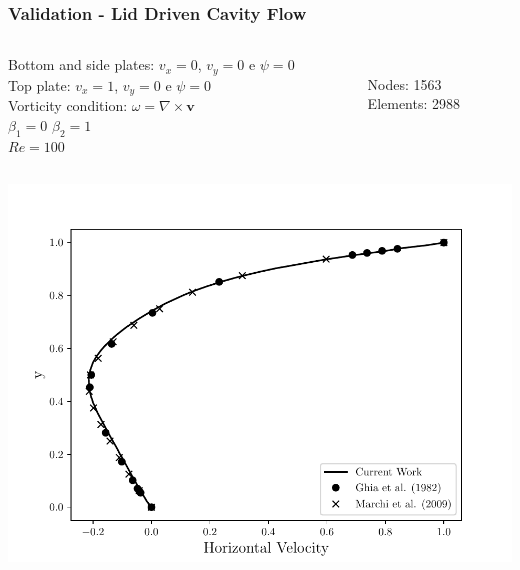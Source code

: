 \begin{frame}
 \frametitle{\LARGE Validation - Lid Driven Cavity Flow}
\vspace{-1.0cm}
\begin{center}
\begin{columns}[c]
\begin{column}{0.65\textwidth} 
\small
Bottom and side plates: $v_{x}=0$, $v_{y}=0$ e $\psi=0$\\[0.1cm]
Top plate: $v_{x}=1$, $v_{y}=0$ e $\psi=0$\\[0.1cm]
Vorticity condition: $\omega = \nabla \times \textbf{v}$\\[0.1cm]
$\beta_{1} = 0$ \qquad $\beta_{2} = 1$\\[0.1cm] 
$Re = 100$
\end{column}
\begin{column}{0.25\textwidth} 
\\
\small Nodes: 1563\\
\small Elements: 2988\\
\end{column}
\end{columns}
\end{center}

\vspace{-0.5cm}
\begin{center}
\begin{columns}[c]
\begin{column}{0.55\textwidth} 
      \includegraphics[scale=0.41]{./images/Re_100_u_profile.pdf}\\
\end{column}


\end{columns}
\end{center}
\end{frame}

